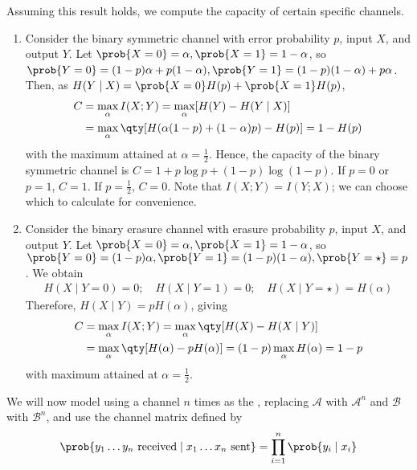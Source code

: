 \begin{example}
    Assuming this result holds, we compute the capacity of certain specific channels.
    \begin{enumerate}
        \item Consider the binary symmetric channel with error probability $p$, input $X$, and output $Y$.
        Let $\prob{X = 0} = \alpha, \prob{X = 1} = 1 - \alpha$, so $\prob{Y = 0} = (1-p)\alpha + p(1-\alpha), \prob{Y = 1} = (1-p)(1-\alpha) + p\alpha$.
        Then, as $H(Y \mid X) = \prob{X=0} H(p) + \prob{X = 1} H(p)$,
        \begin{align*}
            C &= \max_\alpha I(X;Y) = \max_\alpha [H(Y) - H(Y\mid X)] \\
            &= \max_\alpha \qty[H(\alpha(1-p) + (1-\alpha)p) - H(p)] = 1 - H(p)
       \end{align*}
        with the maximum attained at $\alpha = \frac{1}{2}$.
        Hence, the capacity of the binary symmetric channel is $C = 1 + p \log p + (1-p) \log (1-p)$.
        If $p = 0$ or $p = 1$, $C = 1$.
        If $p = \frac{1}{2}$, $C = 0$.
        Note that $I(X;Y) = I(Y;X)$; we can choose which to calculate for convenience.
        \item Consider the binary erasure channel with erasure probability $p$, input $X$, and output $Y$.
        Let $\prob{X = 0} = \alpha, \prob{X = 1} = 1 - \alpha$, so $\prob{Y = 0} = (1-p)\alpha, \prob{Y = 1} = (1-p)(1-\alpha), \prob{Y = \star} = p$.
        We obtain
        \begin{align*}
        H(X \mid Y = 0) = 0;\quad H(X \mid Y = 1) = 0;\quad H(X \mid Y = \star) = H(\alpha)
    \end{align*}
        Therefore, $H(X \mid Y) = pH(\alpha)$, giving
        \begin{align*}
            C &= \max_\alpha I(X;Y) = \max_\alpha \qty[H(X) - H(X \mid Y)] \\
            &= \max_\alpha \qty[H(\alpha) - pH(\alpha)] = (1-p) \max_\alpha H(\alpha) = 1-p
       \end{align*}
        with maximum attained at $\alpha = \frac{1}{2}$.
    \end{enumerate}
\end{example}

We will now model using a channel $n$ times as the , replacing $\mathcal A$ with $\mathcal A^n$ and $\mathcal B$ with $\mathcal B^n$, and use the channel matrix defined by
\begin{align*}
    \prob{y_1 \dots y_n \text{ received} \mid x_1 \dots x_n \text{ sent}} = \prod_{i=1}^n \prob{y_i \mid x_i}
\end{align*}

